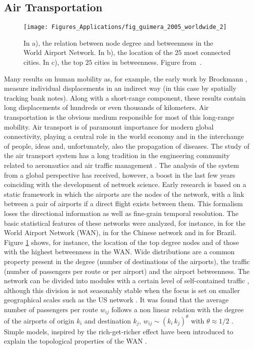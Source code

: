 \subsection{Air Transportation}

\begin{figure}
\centering
\texttt{[image: Figures\_Applications/fig\_guimera\_2005\_worldwide\_2]}
\caption{In a), the relation between node degree and betweenness in the World Airport Network. In b), the location of the $25$ most connected cities. In c), the top $25$ cities in betweenness. Figure from~\cite{guimer`a_2005_worldwide}. \label{fig:guimera_2005_worldwide_2}}
\end{figure}

Many results on human mobility as, for example, the early work by Brockmann \cite{brockmann_2006_scaling}, measure individual displacements in an indirect way (in this case by spatially tracking bank notes). Along with a short-range component, these results contain long displacements of hundreds or even thousands of kilometers. Air transportation is the obvious medium responsible for most of this long-range mobility. Air transport is of paramount importance for modern global connectivity, playing a central role in the world economy and in the interchange of people, ideas and, unfortunately, also the propagation of diseases. 
%
The study of the air transport system has a long tradition in the engineering community related to aeronautics and air traffic management \cite{belobaba_2009_global,cook_2007_european}. The analysis of the system from a global perspective has received, however, a boost in the last few years coinciding with the development of network science. Early research is based on a static framework in which the airports are the nodes of the network, with a link between a pair of airports if a direct flight exists between them. This formalism loses the directional information as well as fine-grain temporal resolution. The basic statistical features of these networks were analyzed, for instance, in \cite{guimera_2004_modeling,barrat_2004_architecture,guimer`a_2005_worldwide} for the World Airport Network (WAN), in \cite{li_2004_statistical} for the Chinese network and in \cite{da_2009_structural} for Brazil. Figure \ref{fig:guimera_2005_worldwide_2} shows, for instance, the location of the top degree nodes and of those with the highest betweenness in the WAN.
%
Wide distributions are a common property present in the degree (number of destinations of the airports), the traffic (number of passengers per route or per airport) and the airport betweenness. The network can be divided into modules with a certain level of self-contained traffic \cite{guimer`a_2005_worldwide}, although this division is not seasonably stable when the focus is set on smaller geographical scales such as the US network \cite{lancichinetti_2011_finding}. It was found that the average number of passengers per route $w_{ij}$ follows a non linear relation with the degree of the airports of origin $k_i$ and destination $k_j$, $w_{ij} \sim (k_i\, k_j)^\theta$ with $\theta \approx 1/2$ \cite{barrat_2004_architecture}. Simple models, inspired by the rich-get-richer effect have been introduced to explain the topological properties of the WAN \cite{guimera_2004_modeling,barrat_2004_architecture}.  
